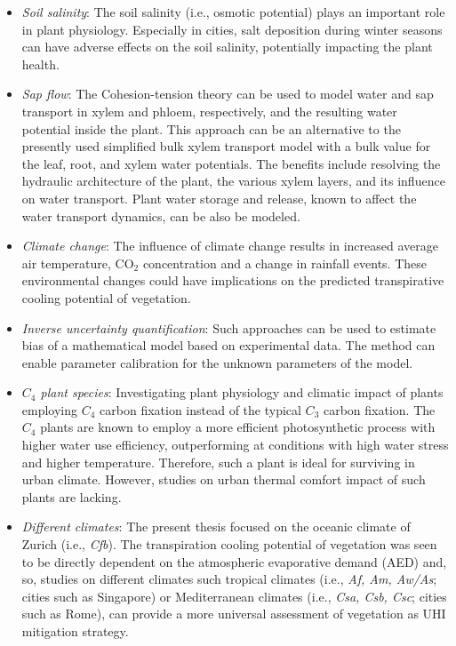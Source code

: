 \begin{itemize}
	\item \textit{Soil salinity}: The soil salinity (i.e., osmotic potential) plays an important role in plant physiology. Especially in cities, salt deposition during winter seasons can have adverse effects on the soil salinity, potentially impacting the plant health. 
	
	\item \textit{Sap flow}: The Cohesion-tension theory can be used to model water and sap transport in xylem and phloem, respectively,  and the resulting water potential inside the plant. This approach can be an alternative to the presently used simplified bulk xylem transport model with a bulk value for the leaf, root, and xylem water potentials. The benefits include resolving the hydraulic architecture of the plant, the various xylem layers, and its influence on water transport. Plant water storage and release, known to affect the water transport dynamics, can be also be modeled.
		
	\item \textit{Climate change}: The influence of climate change results in increased average air temperature, CO$_2$ concentration and a change in rainfall events. These environmental changes could have implications on the predicted transpirative cooling potential of vegetation.
	
	\item \textit{Inverse uncertainty quantification}: Such approaches can be used to estimate bias of a mathematical model based on experimental data. The method can enable parameter calibration for the unknown parameters of the model.  
	
	\item \textit{$C_4$ plant species}:	Investigating plant physiology and climatic impact of plants employing $C_4$ carbon fixation instead of the typical $C_3$ carbon fixation. The $C_4$ plants are known to employ a more efficient photosynthetic process with higher water use efficiency, outperforming at conditions with high water stress and higher temperature. Therefore, such a plant is ideal for surviving in urban climate. However, studies on urban thermal comfort impact of such plants are lacking.
	
	\item \textit{Different climates}: The present thesis focused on the oceanic climate of Zurich (i.e., \textit{Cfb}). The transpiration cooling potential of vegetation was seen to be directly dependent on the atmospheric evaporative demand (AED) and, so, studies on different climates such tropical climates (i.e., \textit{Af, Am, Aw/As}; cities such as Singapore) or Mediterranean climates (i.e., \textit{Csa, Csb, Csc}; cities such as Rome), can provide a more universal assessment of vegetation as UHI mitigation strategy.
	

\end{itemize}
